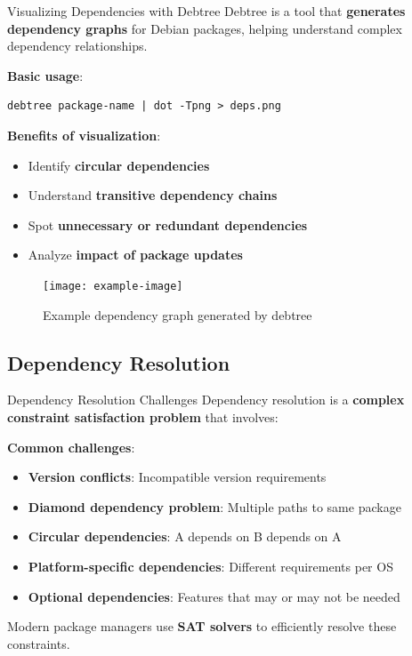 \documentclass{beamer}
\begin{document}
\begin{frame}[t,fragile]{Visualizing Dependencies with Debtree}
Debtree is a tool that \textbf{generates dependency graphs} for Debian packages, helping understand complex dependency relationships.

\bigskip

\textbf{Basic usage}:
\begin{verbatim}
debtree package-name | dot -Tpng > deps.png
\end{verbatim}

\bigskip

\textbf{Benefits of visualization}:
\begin{itemize}
\item Identify \textbf{circular dependencies}
\item Understand \textbf{transitive dependency chains}
\item Spot \textbf{unnecessary or redundant dependencies}
\item Analyze \textbf{impact of package updates}
\end{itemize}

\begin{figure}
\centering
\texttt{[image: example-image]}
\caption{Example dependency graph generated by debtree}
\end{figure}
\end{frame}

\subsection{Dependency Resolution}

\begin{frame}[t]{Dependency Resolution Challenges}
Dependency resolution is a \textbf{complex constraint satisfaction problem} that involves:

\bigskip

\textbf{Common challenges}:
\begin{itemize}
\item \textbf{Version conflicts}: Incompatible version requirements
\item \textbf{Diamond dependency problem}: Multiple paths to same package
\item \textbf{Circular dependencies}: A depends on B depends on A
\item \textbf{Platform-specific dependencies}: Different requirements per OS
\item \textbf{Optional dependencies}: Features that may or may not be needed
\end{itemize}

\bigskip

Modern package managers use \textbf{SAT solvers} to efficiently resolve these constraints.
\end{frame}
\end{document}
